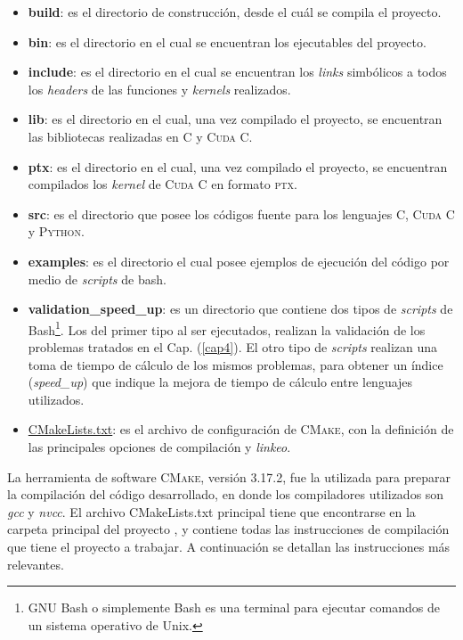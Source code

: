 \begin{itemize}
	\item \textbf{build}: es el directorio de construcción, desde el cuál se compila el proyecto.
	
	\item \textbf{bin}: es el directorio en el cual se encuentran los ejecutables del proyecto.
	
	\item \textbf{include}: es el directorio en el cual se encuentran los \textit{links} simbólicos a todos los \textit{headers} de las funciones y \textit{kernels} realizados.
	
	\item \textbf{lib}: es el directorio en el cual, una vez compilado el proyecto, se encuentran las bibliotecas realizadas en \textsc{C} y \textsc{Cuda C}.
	
	\item \textbf{ptx}: es el directorio en el cual, una vez compilado el proyecto, se encuentran compilados los \textit{kernel} de \textsc{Cuda C} en formato \textsc{ptx}.	
	
	\item \textbf{src}: es el directorio que posee los códigos fuente para los lenguajes \textsc{C}, \textsc{Cuda C} y \textsc{Python}.
	
	\item \textbf{examples}: es el directorio el cual posee ejemplos de ejecución del código por medio de \textit{scripts} de bash.
	
	\item \textbf{validation\_speed\_up}: es un directorio que contiene dos tipos de \textit{scripts} de Bash\footnote{GNU Bash o simplemente Bash es una terminal para ejecutar comandos de un sistema operativo de Unix.}. Los del primer tipo al ser ejecutados, realizan la validación de los problemas tratados en el Cap. (\ref{cap4}). El otro tipo de \textit{scripts} realizan una toma de tiempo de cálculo de los mismos problemas, para obtener un índice (\textit{speed\_up}) que indique la mejora de tiempo de cálculo entre lenguajes utilizados. 
	
	\item \underline{CMakeLists.txt}: es el archivo de configuración de \textsc{CMake}, con la definición de las principales opciones de compilación y \textit{linkeo}.
	
\end{itemize}


La herramienta de software \textsc{CMake}, versión 3.17.2, fue la utilizada para preparar la compilación del código desarrollado, en donde los compiladores utilizados son \textit{gcc} y \textit{nvcc}.  El archivo CMakeLists.txt principal tiene que encontrarse en la carpeta principal del proyecto \cite{cmake:2020:kitware}, y contiene todas las instrucciones de compilación que tiene el proyecto a trabajar. A continuación se detallan las instrucciones más relevantes.

